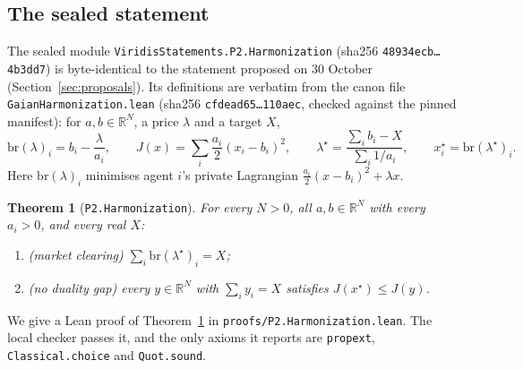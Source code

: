 \documentclass[11pt]{article}
\newtheorem{theorem}{Theorem}
\theoremstyle{definition}
\theoremstyle{remark}
\begin{document}
\subsection{The sealed statement}
The sealed module \texttt{ViridisStatements.P2.Harmonization} (sha256 \texttt{48934ecb\ldots 4b3dd7}) is byte-identical to the
statement proposed on 30 October (Section~\ref{sec:proposals}).
Its definitions are verbatim from the canon file \texttt{GaianHarmonization.lean} (sha256 \texttt{cfdead65\ldots 110aec},
checked against the pinned manifest): for $a,b\in\mathbb{R}^N$, a price $\lambda$ and a target $X$,
\[
\mathrm{br}(\lambda)_i=b_i-\frac{\lambda}{a_i},\qquad J(x)=\sum_i\frac{a_i}{2}(x_i-b_i)^2,\qquad
\lambda^\star=\frac{\sum_i b_i-X}{\sum_i 1/a_i},\qquad x^\star_i=\mathrm{br}(\lambda^\star)_i .
\]
Here $\mathrm{br}(\lambda)_i$ minimises agent $i$'s private Lagrangian $\tfrac{a_i}{2}(x-b_i)^2+\lambda x$.
\begin{theorem}[\texttt{P2.Harmonization}]\label{thm:harmonization}
For every $N>0$, all $a,b\in\mathbb{R}^N$ with every $a_i>0$, and every real $X$:
\begin{enumerate}
\item[(i)] (market clearing) $\sum_i\mathrm{br}(\lambda^\star)_i=X$;
\item[(ii)] (no duality gap) every $y\in\mathbb{R}^N$ with $\sum_i y_i=X$ satisfies $J(x^\star)\le J(y)$.
\end{enumerate}
\end{theorem}
We give a Lean proof of Theorem~\ref{thm:harmonization} in \texttt{proofs/P2.Harmonization.lean}.
The local checker passes it, and the only axioms it reports are \texttt{propext}, \texttt{Classical.choice} and \texttt{Quot.sound}.
\end{document}
